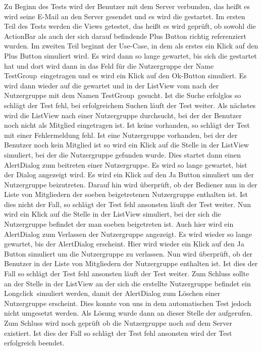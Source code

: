 Zu Beginn des Tests wird der Benutzer mit dem Server verbunden, das heißt es wird seine E-Mail an den Server gesendet und es wird die  gestartet. Im ersten Teil des Tests werden die Views getestet, das heißt es wird geprüft, ob sowohl die ActionBar als auch der sich darauf befindende Plus Button richtig referenziert wurden. Im zweiten Teil beginnt der Use-Case, in dem als erstes ein Klick auf den Plus Button simuliert wird. Es wird dann so lange gewartet, bis sich die  gestartet hat und dort wird dann in das Feld für die Nutzergruppe der Name \glqq TestGroup\grqq\ eingetragen und es wird ein Klick auf den \glqq Ok\grqq-Button simuliert. Es wird dann wieder auf die  gewartet und in der ListView vom  nach der Nutzergruppe mit dem Namen \glqq TestGroup\grqq\ gesucht. Ist die Suche erfolglos so schlägt der Test fehl, bei erfolgreichem Suchen läuft der Test weiter. Als nächstes wird die ListView nach einer Nutzergruppe durchsucht, bei der der Benutzer noch nicht als Mitglied eingetragen ist. Ist keine vorhanden, so schlägt der Test mit einer Fehlermeldung fehl. Ist eine Nutzergruppe vorhanden, bei der der Benutzer noch kein Mitglied ist so wird ein Klick auf die Stelle in der ListView simuliert, bei der die Nutzergruppe gefunden wurde. Dies startet dann einen AlertDialog zum beitreten einer Nutzergruppe. Es wird so lange gewartet, bist der Dialog angezeigt wird. Es wird ein Klick auf den Ja Button simuliert um der Nutzergruppe beizutreten. Darauf hin wird überprüft, ob der Bediener nun in der Liste von Mitgliedern der soeben beigetretenen Nutzergruppe enthalten ist. Ist dies nicht der Fall, so schlägt der Test fehl ansonsten läuft der Test weiter. Nun wird ein Klick auf die Stelle in der ListView simuliert, bei der sich die Nutzergruppe befindet der man soeben beigetreten ist. Auch hier wird ein AlertDialog zum Verlassen der Nutzergruppe angezeigt. Es wird wieder so lange gewartet, bis der AlertDialog erscheint. Hier wird wieder ein Klick auf den Ja Button simuliert um die Nutzergruppe zu verlassen. Nun wird überprüft, ob der Benutzer in der Liste von Mitgliedern der Nutzergruppe enthalten ist. Ist dies der Fall so schlägt der Test fehl ansonsten läuft der Test weiter. Zum Schluss sollte an der Stelle in der ListView an der sich die erstellte Nutzergruppe befindet ein \glqq Longclick\grqq\ simuliert werden, damit der AlertDialog zum Löschen einer Nutzergruppe erscheint. Dies konnte von uns in dem automatischen Test jedoch nicht umgesetzt werden. Als Lösung wurde dann an dieser Stelle der  aufgerufen. Zum Schluss wird noch geprüft ob die Nutzergruppe noch auf dem Server existiert. Ist dies der Fall so schlägt der Test fehl ansonsten wird der Test erfolgreich beendet.

